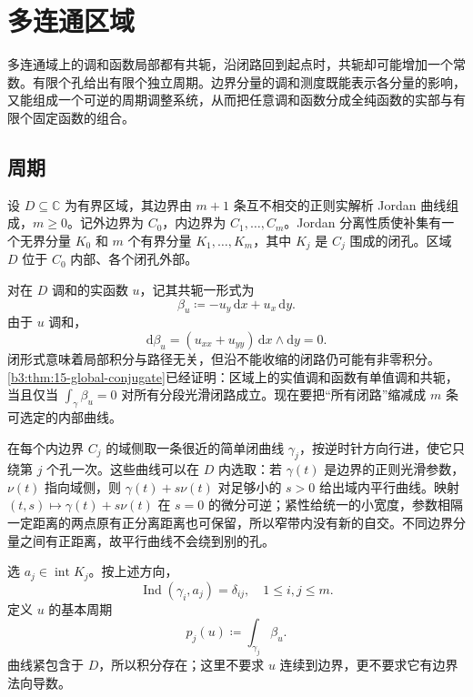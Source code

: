 \section{多连通区域}
\label{b3:sec:1705}

多连通域上的调和函数局部都有共轭，沿闭路回到起点时，共轭却可能增加一个常数。有限个孔给出有限个独立周期。边界分量的调和测度既能表示各分量的影响，又能组成一个可逆的周期调整系统，从而把任意调和函数分成全纯函数的实部与有限个固定函数的组合。

\subsection{周期}
\label{b3:subsec:170501}

设 \(D\subseteq\mathbb C\) 为有界区域，其边界由 \(m+1\) 条互不相交的正则实解析 Jordan 曲线组成，\(m\ge0\)。记外边界为 \(C_0\)，内边界为
\(C_1,\ldots,C_m\)。Jordan 分离性质使补集有一个无界分量 \(K_0\) 和
\(m\) 个有界分量 \(K_1,\ldots,K_m\)，其中 \(K_j\) 是 \(C_j\) 围成的闭孔。区域 \(D\) 位于 \(C_0\) 内部、各个闭孔外部。

\ProseParagraphBreak
对在 \(D\) 调和的实函数 \(u\)，记其共轭一形式为
\[
 \beta_u\coloneqq-u_y\,\mathrm dx+u_x\,\mathrm dy.
\]
由于 \(u\) 调和，
\[
 \mathrm d\beta_u=(u_{xx}+u_{yy})\,\mathrm dx\wedge\mathrm dy=0.
\]
闭形式意味着局部积分与路径无关，但沿不能收缩的闭路仍可能有非零积分。
\cref{b3:thm:15-global-conjugate}已经证明：区域上的实值调和函数有单值调和共轭，当且仅当 \(\int_\gamma\beta_u=0\) 对所有分段光滑闭路成立。现在要把“所有闭路”缩减成 \(m\) 条可选定的内部曲线。

\ProseParagraphBreak
在每个内边界 \(C_j\) 的域侧取一条很近的简单闭曲线 \(\gamma_j\)，按逆时针方向行进，使它只绕第 \(j\) 个孔一次。这些曲线可以在 \(D\) 内选取：若
\(\gamma(t)\) 是边界的正则光滑参数，\(\nu(t)\) 指向域侧，则
\(\gamma(t)+s\nu(t)\) 对足够小的 \(s>0\) 给出域内平行曲线。映射
\((t,s)\mapsto\gamma(t)+s\nu(t)\) 在 \(s=0\) 的微分可逆；紧性给统一的小宽度，参数相隔一定距离的两点原有正分离距离也可保留，所以窄带内没有新的自交。不同边界分量之间有正距离，故平行曲线不会绕到别的孔。

\ProseParagraphBreak
选 \(a_j\in\operatorname{int}K_j\)。按上述方向，
\[
 \operatorname{Ind}(\gamma_i,a_j)=\delta_{ij},
 \quad 1\le i,j\le m.
\]
定义 \(u\) 的基本周期
\[
 p_j(u)\coloneqq\int_{\gamma_j}\beta_u.
\]
曲线紧包含于 \(D\)，所以积分存在；这里不要求 \(u\) 连续到边界，更不要求它有边界法向导数。

